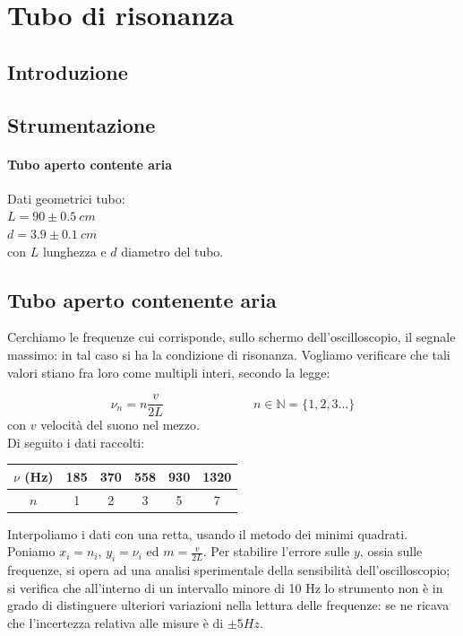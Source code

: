 
\chapter{Tubo di risonanza}

\section{Introduzione}

\section{Strumentazione}
\subsubsection{Tubo aperto contente aria}
Dati geometrici tubo:\\
$L = 90\pm 0.5\ cm$\\
$d = 3.9\pm 0.1\ cm$\\
con $L$ lunghezza e $d$ diametro del tubo.

\section{Tubo aperto contenente aria}
Cerchiamo le frequenze cui corrisponde, sullo schermo dell'oscilloscopio, il segnale massimo: in tal caso si ha la condizione di risonanza. Vogliamo verificare che tali valori stiano fra loro come multipli interi, secondo la legge:

\begin{equation} \label{eq:gianni}
\nu_n= n\frac{v}{2L} \hspace{3cm} n\in\mathbb{N} = \lbrace 1,2,3 \dots \rbrace
\end{equation}
con $v$ velocità del suono nel mezzo.
\\
Di seguito i dati raccolti:
\begin{center}
\begin{tabular}{c|c|c|c|c|c}
$\nu$ (Hz) & 185 & 370 & 558 & 930 & 1320 \\
\midrule
$n$ & 1 & 2 & 3 & 5 & 7\\
\end{tabular}
\end{center}
Interpoliamo i dati con una retta, usando il metodo dei minimi quadrati. Poniamo $x_i=n_i$, $y_i=\nu_i$ ed $m=\displaystyle{\frac{v}{2L}}$. Per stabilire l'errore sulle $y$, ossia sulle frequenze, si opera ad una analisi sperimentale della sensibilità dell'oscilloscopio; si verifica che all'interno di un intervallo minore di 10 Hz lo strumento non è in grado di distinguere ulteriori variazioni nella lettura delle frequenze: se ne ricava che l'incertezza relativa alle misure è di $\pm5 Hz$.

